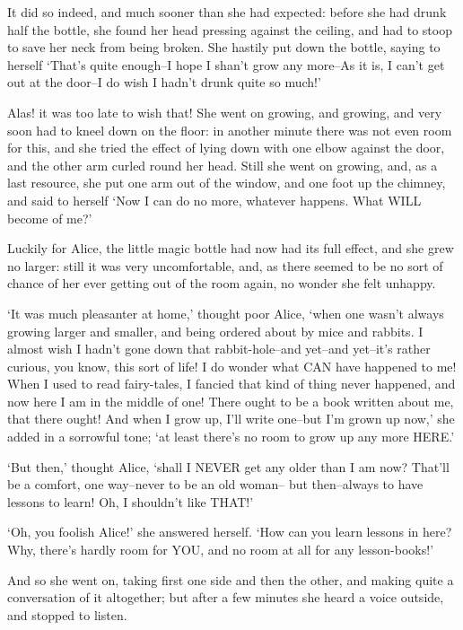 \documentclass[12pt]{book}
\begin{document}
  It did so indeed, and much sooner than she had expected:
before she had drunk half the bottle, she found her head pressing
against the ceiling, and had to stoop to save her neck from being
broken.  She hastily put down the bottle, saying to herself
`That's quite enough--I hope I shan't grow any more--As it is, I
can't get out at the door--I do wish I hadn't drunk quite so
much!'

  Alas! it was too late to wish that!  She went on growing, and
growing, and very soon had to kneel down on the floor:  in
another minute there was not even room for this, and she tried
the effect of lying down with one elbow against the door, and the
other arm curled round her head.  Still she went on growing, and,
as a last resource, she put one arm out of the window, and one
foot up the chimney, and said to herself `Now I can do no more,
whatever happens.  What WILL become of me?'

  Luckily for Alice, the little magic bottle had now had its full
effect, and she grew no larger:  still it was very uncomfortable,
and, as there seemed to be no sort of chance of her ever getting
out of the room again, no wonder she felt unhappy.

  `It was much pleasanter at home,' thought poor Alice, `when one
wasn't always growing larger and smaller, and being ordered about
by mice and rabbits.  I almost wish I hadn't gone down that
rabbit-hole--and yet--and yet--it's rather curious, you know,
this sort of life!  I do wonder what CAN have happened to me!
When I used to read fairy-tales, I fancied that kind of thing
never happened, and now here I am in the middle of one!  There
ought to be a book written about me, that there ought!  And when
I grow up, I'll write one--but I'm grown up now,' she added in a
sorrowful tone; `at least there's no room to grow up any more
HERE.'

  `But then,' thought Alice, `shall I NEVER get any older than I
am now?  That'll be a comfort, one way--never to be an old woman--
but then--always to have lessons to learn!  Oh, I shouldn't like THAT!'

  `Oh, you foolish Alice!' she answered herself.  `How can you
learn lessons in here?  Why, there's hardly room for YOU, and no
room at all for any lesson-books!'

  And so she went on, taking first one side and then the other,
and making quite a conversation of it altogether; but after a few
minutes she heard a voice outside, and stopped to listen.
\end{document}
